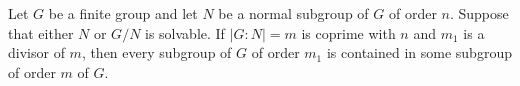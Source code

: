%
%
%
%
%
%
%
%

\begin{corollary}
	Let $G$ be a finite group and let $N$ be a normal subgroup of $G$ of order $n$.
	Suppose that either $N$ or $G/N$ is solvable. If $|G:N|=m$ is coprime with $n$ and
	$m_1$ is a divisor of $m$, then every subgroup of $G$ of order $m_1$ is contained in some subgroup of order $m$ of $G$.
\end{corollary}

